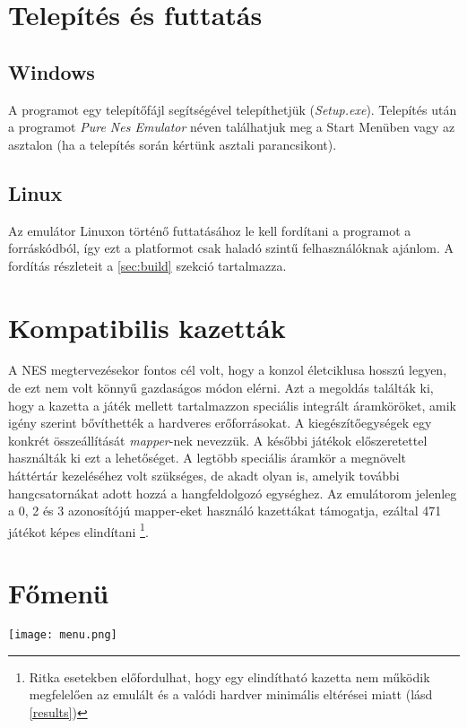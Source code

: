 \section{Telepítés és futtatás}

\subsection{Windows}
A programot egy telepítőfájl segítségével telepíthetjük (\emph{Setup.exe}).
Telepítés után a programot \emph{Pure Nes Emulator} néven találhatjuk meg a Start Menüben vagy az asztalon (ha a telepítés során kértünk asztali parancsikont).

\subsection{Linux}
Az emulátor Linuxon történő futtatásához le kell fordítani a programot a forráskódból, így ezt a platformot csak haladó szintű felhasználóknak ajánlom.
A fordítás részleteit a \ref{sec:build} szekció tartalmazza.

\section{Kompatibilis kazetták}

A NES megtervezésekor fontos cél volt, hogy a konzol életciklusa hosszú legyen, de ezt nem volt könnyű gazdaságos módon elérni. Azt a megoldás találták ki, hogy a kazetta a játék mellett tartalmazzon speciális integrált áramköröket, amik igény szerint bővíthették a hardveres erőforrásokat. A kiegészítőegységek egy konkrét összeállítását \emph{mapper}-nek nevezzük. A későbbi játékok előszeretettel használták ki ezt a lehetőséget. A legtöbb speciális áramkör a megnövelt háttértár kezeléséhez volt szükséges, de akadt olyan is, amelyik további hangcsatornákat adott hozzá a hangfeldolgozó egységhez. Az emulátorom jelenleg a 0, 2 és 3 azonosítójú mapper-eket használó kazettákat támogatja, ezáltal 471 játékot \cite{romlist} képes elindítani \footnote{Ritka esetekben előfordulhat, hogy egy elindítható kazetta nem működik megfelelően az emulált és a valódi hardver minimális eltérései miatt (lásd \ref{results})}.

\section{Főmenü}

\begin{center}
	\texttt{[image: menu.png]}
\end{center}

